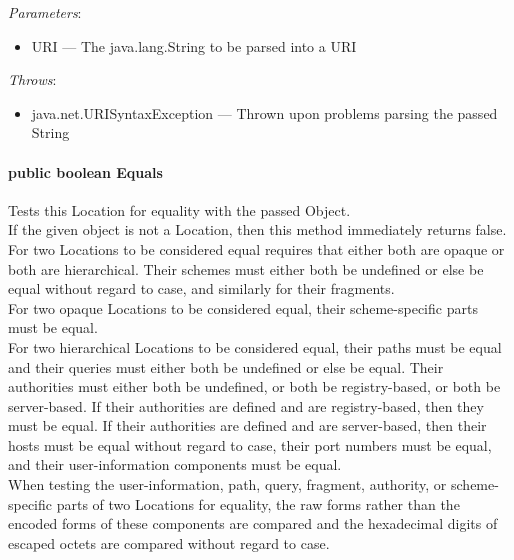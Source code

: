 \documentclass[$Date: 2003/06/26 19:29:31 $]{glabarticle}
\begin{document}
\textit{Parameters}:
\begin{itemize}
\item[] URI --- The java.lang.String to be parsed into a URI 
\end{itemize}

 \textit{Throws}:
 \begin{itemize}
 \item[] java.net.URISyntaxException --- Thrown upon problems parsing the passed String 
 \end{itemize}

\paragraph{public boolean Equals}

Tests this Location for equality with the passed Object. \\

 If the given object is not a Location, then this method immediately
 returns false. \\

 For two Locations to be considered equal requires that either both
 are opaque or both are hierarchical. Their schemes must either both
 be undefined or else be equal without regard to case, and similarly
 for their fragments. \\

 For two opaque Locations to be considered equal, their
 scheme-specific parts must be equal. \\

 For two hierarchical Locations to be considered equal, their paths
 must be equal and their queries must either both be undefined or else
 be equal.  Their authorities must either both be undefined, or both
 be registry-based, or both be server-based.  If their authorities are
 defined and are registry-based, then they must be equal.  If their
 authorities are defined and are server-based, then their hosts must
 be equal without regard to case, their port numbers must be equal,
 and their user-information components must be equal. \\

 When testing the user-information, path, query, fragment, authority,
 or scheme-specific parts of two Locations for equality, the raw forms
 rather than the encoded forms of these components are compared and
 the hexadecimal digits of escaped octets are compared without regard
 to case. \\
 
\end{document}
